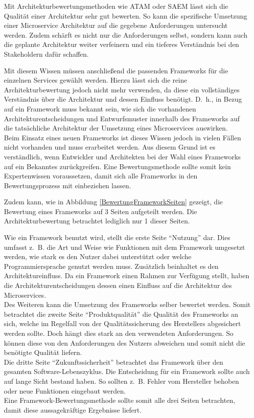 Mit Architekturbewertungsmethoden wie \ac{ATAM} oder \ac{SAEM} lässt sich die Qualität einer Architektur sehr gut bewerten. So kann die spezifische Umsetzung einer Microservice Architektur auf die gegebene Anforderungen untersucht werden. Zudem schärft es nicht nur die Anforderungen selbst, sondern kann auch die geplante Architektur weiter verfeinern und ein tieferes Verständnis bei den Stakeholdern dafür schaffen.

Mit diesem Wissen müssen anschließend die passenden Frameworks für die einzelnen Services gewählt werden. Hierzu lässt sich die reine Architekturbewertung jedoch nicht mehr verwenden, da diese ein vollständiges Verständnis über die Architektur und dessen Einfluss benötigt. D.~h., in Bezug auf ein Framework muss bekannt sein, wie sich die vorhandenen Architekturentscheidungen und Entwurfsmuster innerhalb des Frameworks auf die tatsächliche Architektur der Umsetzung eines Microservices auswirken.\\
Beim Einsatz eines neuen Frameworks ist dieses Wissen jedoch in vielen Fällen nicht vorhanden und muss erarbeitet werden. Aus diesem Grund ist es verständlich, wenn Entwickler und Architekten bei der Wahl eines Frameworks auf ein Bekanntes zurückgreifen. Eine Bewertungsmethode sollte somit kein Expertenwissen voraussetzen, damit sich alle Frameworks in den Bewertungsprozess mit einbeziehen lassen.

Zudem kann, wie in Abbildung \ref{BewertungFrameworkSeiten} gezeigt, die Bewertung eines Frameworks auf 3 Seiten aufgeteilt werden. Die Architekturbewertung betrachtet lediglich nur 1 dieser Seiten.


Wie ein Framework benutzt wird, stellt die erste Seite \enquote{Nutzung} dar. Dies umfasst z.~B. die Art und Weise wie Funktionen mit dem Framework umgesetzt werden, wie stark es den Nutzer dabei unterstützt oder welche Programmiersprache genutzt werden muss. Zusätzlich beinhaltet es den Architektureinfluss. Da ein Framework einen Rahmen zur Verfügung stellt, haben die Architekturentscheidungen dessen einen Einfluss auf die Architektur des Microservices.\\
Des Weiteren kann die Umsetzung des Frameworks selber bewertet werden. Somit betrachtet die zweite Seite \enquote{Produktqualität} die Qualität des Frameworks an sich, welche im Regelfall von der Qualitätssicherung des Herstellers abgesichert werden sollte. Doch hängt dies stark an den verwendeten Anforderungen. So können diese von den Anforderungen des Nutzers abweichen und somit nicht die benötigte Qualität liefern.\\
Die dritte Seite \enquote{Zukunftssicherheit} betrachtet das Framework über den gesamten Software-Lebenszyklus. Die Entscheidung für ein Framework sollte auch auf lange Sicht bestand haben. So sollten z.~B. Fehler vom Hersteller behoben oder neue Funktionen eingebaut werden.\\

Eine Framework-Bewertungsmethode sollte somit alle drei Seiten betrachten, damit diese aussagekräftige Ergebnisse liefert. 




